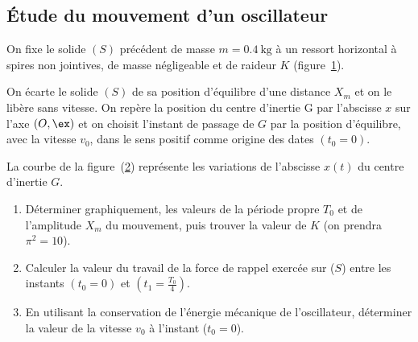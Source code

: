 \subsection{Étude du mouvement d'un oscillateur}
On fixe le solide $(S)$ précédent de masse $m=\qty{0,4}{\kg}$ à un ressort
horizontal à spires non jointives, de masse négligeable et de raideur $K$
(figure~\ref{fig:solide_ressort}).

On écarte le solide $(S)$ de sa position d'équilibre d'une distance $X_{m}$ et
on le libère sans vitesse. On repère la position du centre d'inertie G par
l'abscisse $x$ sur l'axe $(O,\ex)$ et on choisit l'instant de passage de $G$ par
la position d'équilibre, avec la vitesse $v_{0}$, dans le sens positif comme
origine des dates $(t_{0}=0)$.

La courbe de la figure~(\ref{fig:xG_de_t}) représente les variations de
l'abscisse $x(t)$ du centre d'inertie $G$.
\begin{figure}[H]
    \centering
    \begin{subfigure}{0.45\textwidth}
        \centering
        
        \caption{}
        \label{fig:solide_ressort}
    \end{subfigure}
    \hfill
    \begin{subfigure}{0.45\textwidth}
        \centering
        \caption{}
        \label{fig:xG_de_t}
    \end{subfigure}
    \caption{}
    \label{fig:}
\end{figure}
\begin{enumerate}
    \item Déterminer graphiquement, les valeurs de la période propre $T_{0}$ et
          de l'amplitude $X_{m}$ du mouvement, puis trouver la valeur de $K$ (on
          prendra $\pi^{2}=10$).
    \item Calculer la valeur du travail de la force de rappel exercée sur ($S$)
          entre les instants $(t_{0}=0)$ et $(t_{1}=\frac{T_{0}}{4})$.
    \item En utilisant la conservation de l'énergie mécanique de l'oscillateur,
          déterminer la valeur de la vitesse $v_{0}$ à l'instant ($t_{0}=0$).
\end{enumerate}

